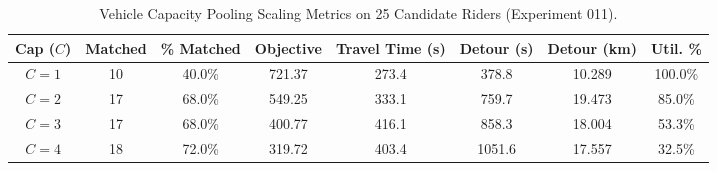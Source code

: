 \begin{table}[htbp]
\centering
\small
\caption{Vehicle Capacity Pooling Scaling Metrics on 25 Candidate Riders (Experiment 011).}
\label{tab:capacity_scaling}
\begin{tabular}{c c c c c c c c}
\toprule
\textbf{Cap ($C$)} & \textbf{Matched} & \textbf{\% Matched} & \textbf{Objective} & \textbf{Travel Time (s)} & \textbf{Detour (s)} & \textbf{Detour (km)} & \textbf{Util. \%} \\
\midrule
$C=1$ & 10 & 40.0\% & 721.37 & 273.4 & 378.8 & 10.289 & 100.0\% \\
$C=2$ & 17 & 68.0\% & 549.25 & 333.1 & 759.7 & 19.473 & 85.0\% \\
$C=3$ & 17 & 68.0\% & 400.77 & 416.1 & 858.3 & 18.004 & 53.3\% \\
$C=4$ & 18 & 72.0\% & 319.72 & 403.4 & 1051.6 & 17.557 & 32.5\% \\
\bottomrule
\end{tabular}
\end{table}
